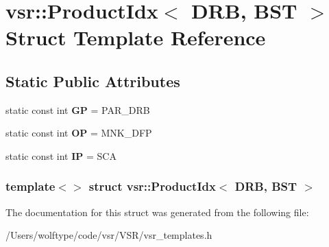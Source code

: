\hypertarget{structvsr_1_1_product_idx_3_01_d_r_b_00_01_b_s_t_01_4}{\section{vsr\-:\-:Product\-Idx$<$ D\-R\-B, B\-S\-T $>$ Struct Template Reference}
\label{structvsr_1_1_product_idx_3_01_d_r_b_00_01_b_s_t_01_4}
}
\subsection*{Static Public Attributes}
\begin{DoxyCompactItemize}
\item 
\hypertarget{structvsr_1_1_product_idx_3_01_d_r_b_00_01_b_s_t_01_4_a9f5525519820546d08f48ed5292dd50b}{static const int {\bfseries G\-P} = P\-A\-R\-\_\-\-D\-R\-B}\label{structvsr_1_1_product_idx_3_01_d_r_b_00_01_b_s_t_01_4_a9f5525519820546d08f48ed5292dd50b}

\item 
\hypertarget{structvsr_1_1_product_idx_3_01_d_r_b_00_01_b_s_t_01_4_a663ef6f262ce51ed9be4f34bf0e9c275}{static const int {\bfseries O\-P} = M\-N\-K\-\_\-\-D\-F\-P}\label{structvsr_1_1_product_idx_3_01_d_r_b_00_01_b_s_t_01_4_a663ef6f262ce51ed9be4f34bf0e9c275}

\item 
\hypertarget{structvsr_1_1_product_idx_3_01_d_r_b_00_01_b_s_t_01_4_a6d2958f239bb414a1ccad83ac0804645}{static const int {\bfseries I\-P} = S\-C\-A}\label{structvsr_1_1_product_idx_3_01_d_r_b_00_01_b_s_t_01_4_a6d2958f239bb414a1ccad83ac0804645}

\end{DoxyCompactItemize}
\subsubsection*{template$<$$>$ struct vsr\-::\-Product\-Idx$<$ D\-R\-B, B\-S\-T $>$}



The documentation for this struct was generated from the following file\-:\begin{DoxyCompactItemize}
\item 
/\-Users/wolftype/code/vsr/\-V\-S\-R/vsr\-\_\-templates.\-h\end{DoxyCompactItemize}
